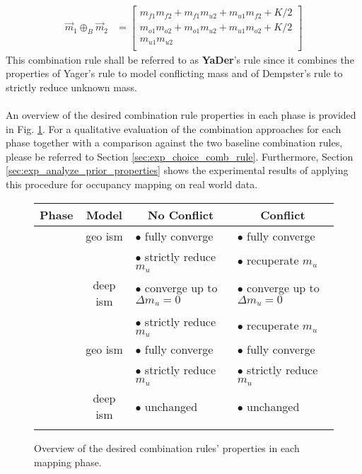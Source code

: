 \begin{align}
	\label{eq:yaders_rule}
	\vec{m}_1 \oplus_B \vec{m}_2 &=  
	\begin{bmatrix} 
		m_{f1}m_{f2} + m_{f1}m_{u2} + m_{u1}m_{f2} + K/2\\
		m_{o1}m_{o2} + m_{o1}m_{u2} + m_{u1}m_{o2} + K/2\\
		m_{u1}m_{u2}\\
	\end{bmatrix}
\end{align}
This combination rule shall be referred to as \textbf{YaDer}'s rule since it combines the properties of Yager's rule to model conflicting mass and of Dempster's rule to strictly reduce unknown mass. 
\\\\
An overview of the desired combination rule properties in each phase is provided in Fig. \ref{tab:desired_comb_rule_properties}. For a qualitative evaluation of the combination approaches for each phase together with a comparison against the two baseline combination rules, please be referred to Section \ref{sec:exp_choice_comb_rule}. Furthermore, Section \ref{sec:exp_analyze_prior_properties} shows the experimental results of applying this procedure for occupancy mapping on real world data. 
\begin{figure}
\begin{center}
	\begin{tabular}{c|c|l|l}
		\multicolumn{1}{c|}{\bfseries Phase} & 
		\multicolumn{1}{c|}{\bfseries Model} &  	
		\multicolumn{1}{c|}{\bfseries No Conflict} &  	
		\multicolumn{1}{c}{\bfseries Conflict}\\
\hline
		\parbox[t]{5mm}{}
		& geo \gls{ism}
		& $\bullet$ fully converge & $\bullet$ fully converge \\
		&
		& $\bullet$ strictly reduce $m_u$& $\bullet$ recuperate $m_u$ \\
		& deep \gls{ism}
		& $\bullet$ converge up to $\Delta m_u = 0$ & $\bullet$ converge up to $\Delta m_u = 0$ \\
		&
		& $\bullet$ strictly reduce $m_u$ & $\bullet$ recuperate $m_u$ \\
\hline
\hline
	\parbox[t]{5mm}{} 
	& geo \gls{ism}
	& $\bullet$ fully converge & $\bullet$ fully converge \\
	& 
	& $\bullet$ strictly reduce $m_u$ & $\bullet$ strictly reduce $m_u$ \\
	&deep \gls{ism}
	& $\bullet$ unchanged & $\bullet$ unchanged \\
	&&&
	\end{tabular}
\end{center} 
	\caption{\label{tab:desired_comb_rule_properties}Overview of the desired combination rules' properties in each mapping phase.}
\end{figure}